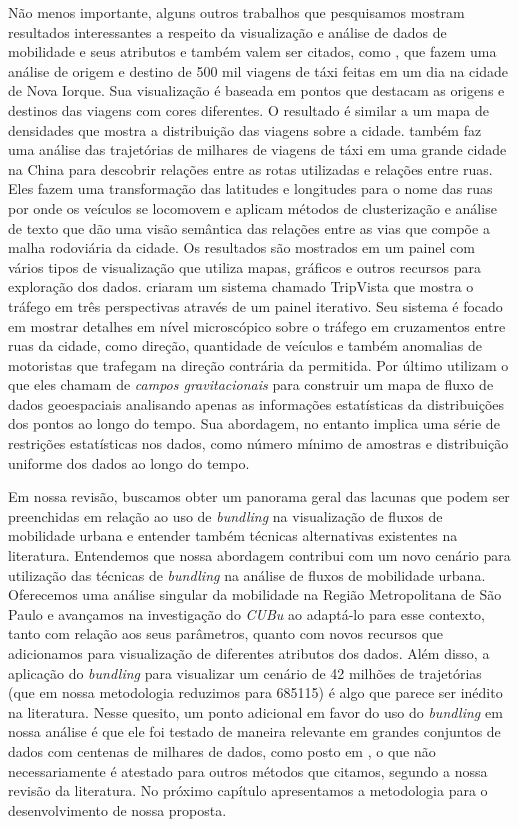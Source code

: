 Não menos importante, alguns outros trabalhos que pesquisamos mostram resultados
interessantes a respeito da visualização e análise de dados de mobilidade e seus
atributos e também valem ser citados, como \citet{Ferreira2013}, que fazem uma
análise de origem e destino de 500 mil viagens de táxi feitas em um dia na
cidade de Nova Iorque. Sua visualização é baseada em pontos que destacam as
origens e destinos das viagens com cores diferentes. O resultado é similar a um
mapa de densidades que mostra a distribuição das viagens sobre a cidade.
\citet{Chu2014} também faz uma análise das trajetórias de milhares de viagens
de táxi em uma grande cidade na China para descobrir relações entre as rotas
utilizadas e relações entre ruas. Eles fazem uma transformação das latitudes e
longitudes para o nome das ruas por onde os veículos se locomovem e aplicam métodos de
clusterização e análise de texto que dão uma visão semântica das relações entre
as vias que compõe a malha rodoviária da cidade. Os resultados são mostrados em
um painel com vários tipos de visualização que utiliza mapas, gráficos e outros
recursos para exploração dos dados. \citet{Guo2011} criaram um sistema chamado
TripVista que mostra o tráfego em três perspectivas através de um painel
iterativo.  Seu sistema é focado em mostrar detalhes em nível microscópico
sobre o tráfego em cruzamentos entre ruas da cidade, como direção, quantidade
de veículos e também anomalias de motoristas que trafegam na direção contrária
da permitida. Por último \citet{Kim2018} utilizam o que eles chamam de \emph{campos
gravitacionais} para construir um mapa de fluxo de dados geoespaciais
analisando apenas as informações estatísticas da distribuições dos pontos ao
longo do tempo. Sua abordagem, no entanto implica uma série de restrições
estatísticas nos dados, como número mínimo de amostras e distribuição uniforme
dos dados ao longo do tempo.

Em nossa revisão, buscamos obter um panorama geral das lacunas que podem ser
preenchidas em relação ao uso de \emph{bundling} na visualização de fluxos de
mobilidade urbana e entender também técnicas alternativas existentes na
literatura. Entendemos que nossa abordagem contribui com um novo cenário para
utilização das técnicas de \emph{bundling} na análise de fluxos de mobilidade
urbana. Oferecemos uma análise singular da mobilidade na Região Metropolitana de
São Paulo e avançamos na investigação do \emph{CUBu} ao adaptá-lo para esse
contexto, tanto com relação aos seus parâmetros, quanto com novos recursos que
adicionamos para visualização de diferentes atributos dos dados. Além disso, a
aplicação do \emph{bundling} para visualizar um cenário de 42 milhões de
trajetórias (que em nossa metodologia reduzimos para \num{685115}) é algo que
parece ser inédito na literatura. Nesse quesito, um ponto adicional em favor do
uso do \emph{bundling} em nossa análise é que ele foi testado de maneira
relevante em grandes conjuntos de dados com centenas de milhares de dados, como
posto em \citet{Telea2018, Lhuillier2017}, o que não necessariamente é atestado
para outros métodos que citamos, segundo a nossa revisão da literatura.  No
próximo capítulo apresentamos a metodologia para o desenvolvimento de nossa
proposta.